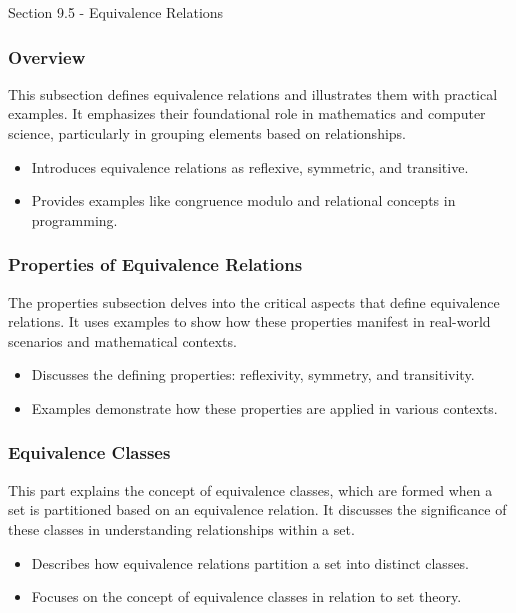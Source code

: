 \begin{notes}{Section 9.5 - Equivalence Relations}
    \subsubsection*{Overview}
    This subsection defines equivalence relations and illustrates them with practical examples. It emphasizes their foundational role in mathematics and computer science, particularly in grouping 
    elements based on relationships.
    \begin{itemize}
        \item Introduces equivalence relations as reflexive, symmetric, and transitive.
        \item Provides examples like congruence modulo and relational concepts in programming.
    \end{itemize}
    
    \subsubsection*{Properties of Equivalence Relations}
    The properties subsection delves into the critical aspects that define equivalence relations. It uses examples to show how these properties manifest in real-world scenarios and mathematical 
    contexts.
    \begin{itemize}
        \item Discusses the defining properties: reflexivity, symmetry, and transitivity.
        \item Examples demonstrate how these properties are applied in various contexts.
    \end{itemize}
    
    \subsubsection*{Equivalence Classes}
    This part explains the concept of equivalence classes, which are formed when a set is partitioned based on an equivalence relation. It discusses the significance of these classes in understanding 
    relationships within a set.
    \begin{itemize}
        \item Describes how equivalence relations partition a set into distinct classes.
        \item Focuses on the concept of equivalence classes in relation to set theory.
    \end{itemize}
    

\end{notes}
